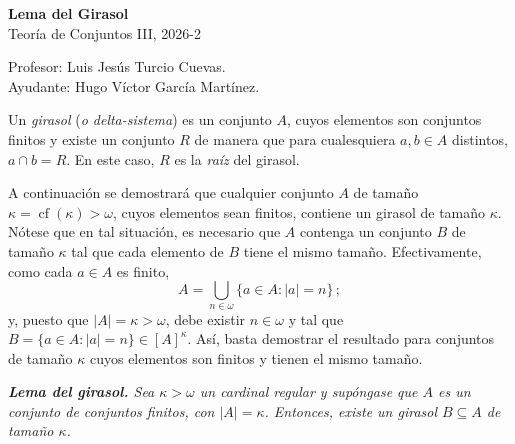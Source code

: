 \documentclass[letterpaper,DIV=15,12pt]{scrartcl}
\newcommand{\tq}{:}
\begin{document}
\thispagestyle{plain}

    \begin{center}
        {\fontsize{30}{60}\rmfamily \textbf{Lema del Girasol}} \\ \vspace{.2cm} Teoría de Conjuntos III, 2026-2
    \end{center}
    \begin{flushright}
        \footnotesize \hfill Profesor: Luis Jesús Turcio Cuevas.\\
        \hfill Ayudante: Hugo Víctor García Martínez.
    \end{flushright}

    Un \textit{girasol} (\textit{o delta-sistema}) es un conjunto $A$, cuyos elementos son conjuntos finitos y existe un conjunto $R$ de manera que para cualesquiera $a,b \in A$ distintos, $a \cap b = R$. En este caso, $R$ es la \textit{raíz} del girasol.

    A continuación se demostrará que cualquier conjunto $A$ de tamaño $\kappa=\operatorname*{cf}(\kappa)>\omega$, cuyos elementos sean finitos, contiene un girasol de tamaño $\kappa$. Nótese que en tal situación, es necesario que $A$ contenga un conjunto $B$ de tamaño $\kappa$ tal que cada elemento de $B$ tiene el mismo tamaño. Efectivamente, como cada $a \in A$ es finito,
        \[ A = \bigcup_{n \in \omega} \{ a \in A \tq |a|=n \} \, ; \]
    y, puesto que $|A|=\kappa>\omega$, debe existir $n \in \omega$ y tal que $B=\{a \in A \tq |a|=n\} \in [A]^\kappa$. Así, basta demostrar el resultado para conjuntos de tamaño $\kappa$ cuyos elementos son finitos y tienen el mismo tamaño. \vspace{.2cm}
    
    {\noindent \itshape \textbf{Lema del girasol.}
        Sea $\kappa > \omega$ un cardinal regular y supóngase que $A$ es un conjunto de conjuntos finitos, con $|A|=\kappa$. Entonces, existe un girasol $B \subseteq A$ de tamaño $\kappa$.
    }
\end{document}
